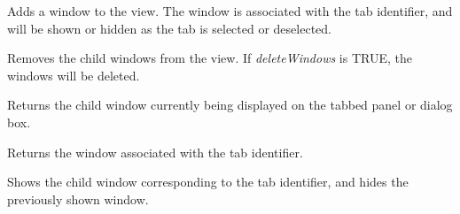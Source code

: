 Adds a window to the view. The window is associated with the tab identifier, and will be shown or hidden as the tab
is selected or deselected.



Removes the child windows from the view. If {\it deleteWindows} is TRUE, the windows will be deleted.



Returns the child window currently being displayed on the tabbed panel or dialog box.



Returns the window associated with the tab identifier.



Shows the child window corresponding to the tab identifier, and hides the previously shown window.


